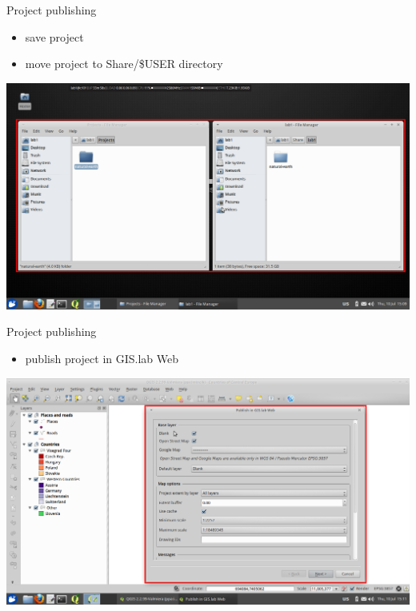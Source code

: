 \documentclass[12pt]{beamer}
\begin{document}
\begin{frame}{Project publishing}
	\begin{itemize}
		\item save project
		\item move project to Share/\$USER directory
	\end{itemize}
	\begin{center}
		\includegraphics[keepaspectratio=true,height=0.6\textheight]{images/rapid-gis-deployment/project-share-directory.png}
	\end{center}
\end{frame}


\begin{frame}{Project publishing}
	\begin{itemize}
		\item publish project in GIS.lab Web
	\end{itemize}
	\begin{center}
		\includegraphics[keepaspectratio=true,height=0.6\textheight]{images/rapid-gis-deployment/project-publish.png}
	\end{center}
\end{frame}
\end{document}

